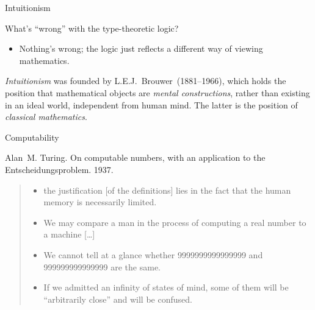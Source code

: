 \documentclass[t,compress,hyperref={hidelinks}]{beamer}
\begin{document}
\begin{frame}{Intuitionism}

What's ``wrong'' with the type-theoretic logic?
\begin{itemize}
\item Nothing's wrong; the logic just reflects a different way of viewing mathematics.
\end{itemize}

\emph{Intuitionism} was founded by L.E.J.~Brouwer~(1881--1966), which holds the position that mathematical objects are \emph{mental constructions}, rather than existing in an ideal world, independent from human mind.
The latter is the position of \emph{classical mathematics}.

\end{frame}

\begin{frame}{Computability}

Alan~M. Turing. On computable numbers, with an application to the Entscheidungsproblem. 1937.

\begin{quote}
\normalfont
\begin{itemize}
\item\relax [\ldots] the justification [of the definitions] lies in the fact that the human memory is necessarily limited.
\vspace*{1ex}
\item We may compare a man in the process of computing a real number to a machine [\ldots]
\vspace*{1ex}
\item{} We cannot tell at a glance whether 9999999999999999 and 999999999999999 are the same.
\vspace*{1ex}
\item{} If we admitted an infinity of states of mind, some of them will be ``arbitrarily close'' and will be confused.
\end{itemize}
\end{quote}

\end{frame}
\end{document}
